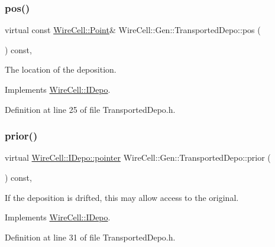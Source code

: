 \subsubsection{\texorpdfstring{pos()}{pos()}}
{\footnotesize\ttfamily virtual const \hyperlink{namespace_wire_cell_ab2b2565fa6432efbb4513c14c988cda9}{Wire\+Cell\+::\+Point}\& Wire\+Cell\+::\+Gen\+::\+Transported\+Depo\+::pos (\begin{DoxyParamCaption}{ }\end{DoxyParamCaption}) const\hspace{0.3cm}{\ttfamily [inline]}, {\ttfamily [virtual]}}



The location of the deposition. 



Implements \hyperlink{class_wire_cell_1_1_i_depo_a6ea54d469c6d0429d16425917ec24241}{Wire\+Cell\+::\+I\+Depo}.



Definition at line 25 of file Transported\+Depo.\+h.

\mbox{\label{class_wire_cell_1_1_gen_1_1_transported_depo_af0a35d96f56e8039264cadd795535633}} 
\subsubsection{\texorpdfstring{prior()}{prior()}}
{\footnotesize\ttfamily virtual \hyperlink{class_wire_cell_1_1_i_data_aff870b3ae8333cf9265941eef62498bc}{Wire\+Cell\+::\+I\+Depo\+::pointer} Wire\+Cell\+::\+Gen\+::\+Transported\+Depo\+::prior (\begin{DoxyParamCaption}{ }\end{DoxyParamCaption}) const\hspace{0.3cm}{\ttfamily [inline]}, {\ttfamily [virtual]}}



If the deposition is drifted, this may allow access to the original. 



Implements \hyperlink{class_wire_cell_1_1_i_depo_a440532d005a463cc9df5731ddb96f601}{Wire\+Cell\+::\+I\+Depo}.



Definition at line 31 of file Transported\+Depo.\+h.

